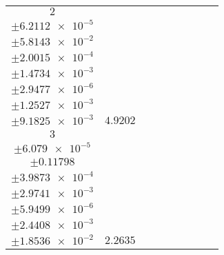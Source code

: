 \documentclass[8pt]{article}
\begin{document}
\begin{longtable}[l]{c c c c c c c c c}
$\num{2}$ & \begin{tabular}[c]{@{}c@{}}$\num{6.1701e-2}$ \\ $\pm\num{6.2112e-5}$\end{tabular} & \begin{tabular}[c]{@{}c@{}}$\num{0.37253}$ \\ $\pm\num{5.8143e-2}$\end{tabular} & \begin{tabular}[c]{@{}c@{}}$\num{-5.2044}$ \\ $\pm\num{2.0015e-4}$\end{tabular} & \begin{tabular}[c]{@{}c@{}}$\num{632.58}$ \\ $\pm\num{1.4734e-3}$\end{tabular} & \begin{tabular}[c]{@{}c@{}}$\num{1.2655}$ \\ $\pm\num{2.9477e-6}$\end{tabular} & \begin{tabular}[c]{@{}c@{}}$\num{1.1779}$ \\ $\pm\num{1.2527e-3}$\end{tabular} & \begin{tabular}[c]{@{}c@{}}$\num{4.167}$ \\ $\pm\num{9.1825e-3}$\end{tabular} & $\num{4.9202}$\\
$\num{3}$ & \begin{tabular}[c]{@{}c@{}}$\num{3.0036e-2}$ \\ $\pm\num{6.079e-5}$\end{tabular} & \begin{tabular}[c]{@{}c@{}}$\num{0.73453}$ \\ $\pm\num{0.11798}$\end{tabular} & \begin{tabular}[c]{@{}c@{}}$\num{-1.9116}$ \\ $\pm\num{3.9873e-4}$\end{tabular} & \begin{tabular}[c]{@{}c@{}}$\num{635.89}$ \\ $\pm\num{2.9741e-3}$\end{tabular} & \begin{tabular}[c]{@{}c@{}}$\num{1.2721}$ \\ $\pm\num{5.9499e-6}$\end{tabular} & \begin{tabular}[c]{@{}c@{}}$\num{1.1437}$ \\ $\pm\num{2.4408e-3}$\end{tabular} & \begin{tabular}[c]{@{}c@{}}$\num{4.1451}$ \\ $\pm\num{1.8536e-2}$\end{tabular} & $\num{2.2635}$\\

\end{longtable}
\end{document}
